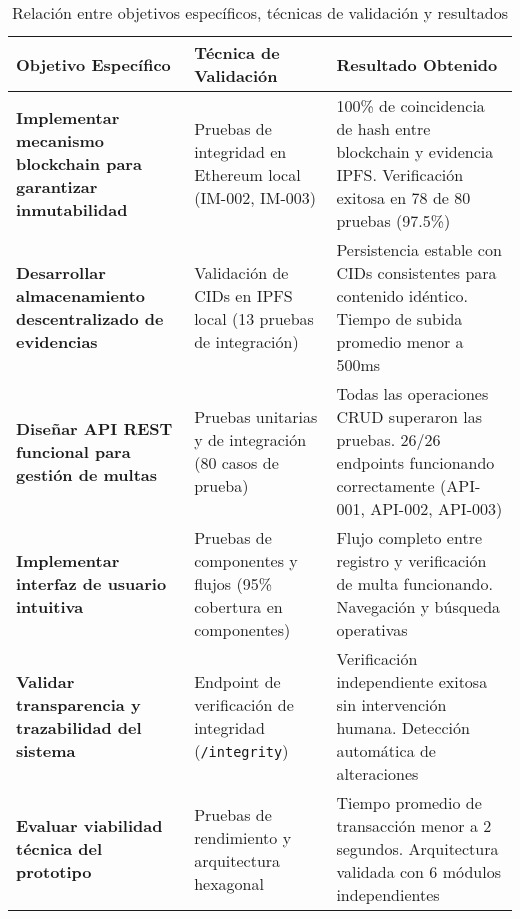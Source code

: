 \begin{table}[htbp]
\centering
\caption{Relación entre objetivos específicos, técnicas de validación y resultados}
\begin{adjustbox}{max width=\textwidth}
\begin{tabular}{@{}p{4.5cm}p{4cm}p{6cm}@{}}
\toprule
\textbf{Objetivo Específico} & \textbf{Técnica de Validación} & \textbf{Resultado Obtenido} \\
\midrule

\textbf{Implementar mecanismo blockchain para garantizar inmutabilidad} &
Pruebas de integridad en Ethereum local (IM-002, IM-003) &
100\% de coincidencia de hash entre blockchain y evidencia IPFS. Verificación exitosa en 78 de 80 pruebas (97.5\%) \\
\addlinespace

\textbf{Desarrollar almacenamiento descentralizado de evidencias} &
Validación de CIDs en IPFS local (13 pruebas de integración) &
Persistencia estable con CIDs consistentes para contenido idéntico. Tiempo de subida promedio menor a 500ms \\
\addlinespace

\textbf{Diseñar API REST funcional para gestión de multas} &
Pruebas unitarias y de integración (80 casos de prueba) &
Todas las operaciones CRUD superaron las pruebas. 26/26 endpoints funcionando correctamente (API-001, API-002, API-003) \\
\addlinespace

\textbf{Implementar interfaz de usuario intuitiva} &
Pruebas de componentes y flujos (95\% cobertura en componentes) &
Flujo completo entre registro y verificación de multa funcionando. Navegación y búsqueda operativas \\
\addlinespace

\textbf{Validar transparencia y trazabilidad del sistema} &
Endpoint de verificación de integridad (\texttt{/integrity}) &
Verificación independiente exitosa sin intervención humana. Detección automática de alteraciones \\
\addlinespace

\textbf{Evaluar viabilidad técnica del prototipo} &
Pruebas de rendimiento y arquitectura hexagonal &
Tiempo promedio de transacción menor a 2 segundos. Arquitectura validada con 6 módulos independientes \\

\bottomrule
\end{tabular}
\end{adjustbox}
\end{table}

